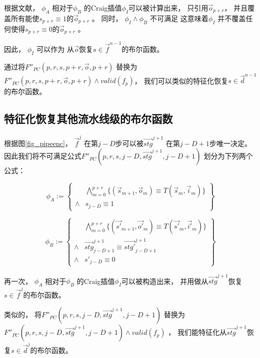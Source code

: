 根据文献，
$\phi_A$ 相对于$\phi_B$ 的Craig插值$\phi_I$可以被计算出来，
只引用$\vec{o}_{p+r}$，
并且覆盖所有能使$s_{p+r}\equiv 1$的$\vec{o}_{p+r}$ 。
同时，
$\phi_I\wedge \phi_B$ 不可满足
这意味着$\phi_I$ 并不覆盖任何使得$s_{p+r}\equiv 0$的$\vec{o}_{p+r}$ 。

因此，
$\phi_I$ 可以作为
从$\vec{o}$恢复$s\in \vec{f}^{n-1}$的布尔函数。

通过将$F''_{PC}(p,r,s,p+r,\vec{o},p+r)$ 替换为$F''_{PC}(p,r,s,p+r,\vec{o},p+r)\wedge valid(f_p)$，
我们可以类似的特征化恢复$s\in\vec{d}^{n-1}$的布尔函数。

\subsection{特征化恢复其他流水线级的布尔函数}
根据图\ref{fig_pipeenc}，
$\vec{f}^j$ 在第$j-D$步可以被$\vec{stg}^{j+1}$ 在第$j-D+1$步唯一决定。
因此我们将不可满足公式$F''_{PC}(p,r,s,j-D,\vec{stg}^{j+1},j-D+1)$
划分为下列两个公式：

\begin{equation}
 \phi_A :=
 \left\{
\begin{array}{cc}
&\bigwedge_{m=0}^{p+r}
\{
(\vec{s}_{m+1},\vec{o}_m)\equiv T(\vec{s}_m,\vec{i}_m)
\}
\\
\wedge& s_{j-D}\equiv 1
\end{array}
\right\}
\end{equation}

\begin{equation}
\phi_B :=
\left\{
\begin{array}{cc}
&\bigwedge_{m=0}^{p+r}
\{
(\vec{s'}_{m+1},\vec{o'}_m)\equiv T(\vec{s'}_m,\vec{i'}_m)
\}
\\
\wedge&\vec{stg}^{j+1}_{j-D+1}\equiv \vec{stg'}^{j+1}_{j-D+1} \\
\wedge& s'_{j-D}\equiv 0
\end{array}
\right\}
\end{equation}

再一次，
$\phi_A$ 相对于$\phi_B$ 的Craig插值$\phi_I$可以被构造出来，
并用做从$\vec{stg}^{j+1}$恢复$s\in\vec{f}^{j}$的布尔函数。

类似的，
将$F''_{PC}(p,r,s,j-D,\vec{stg}^{j+1},j-D+1)$  替换为
$F''_{PC}(p,r,s,j-D,\vec{stg}^{j+1},j-D+1)\wedge valid(f_p)$ ，
我们能特征化从$\vec{stg}^{j+1}$恢复$s\in\vec{d}^{j}$的布尔函数。

